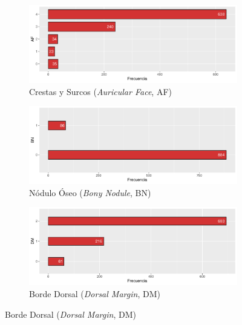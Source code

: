 \begin{figure}[h]
    \centering
    \begin{subfigure}{\textwidth}
        \includegraphics[width=\linewidth]{../../scripts/eda/eda_univar/char_af_distr.pdf}
        \caption{Crestas y Surcos (\textit{Auricular Face}, AF)}
        \label{fig4:todd_chars__af}
    \end{subfigure}

    \begin{subfigure}{\textwidth}
        \includegraphics[width=\linewidth]{../../scripts/eda/eda_univar/char_bn_distr.pdf}
        \caption{Nódulo Óseo (\textit{Bony Nodule}, BN)}
        \label{fig4:todd_chars__bn}
    \end{subfigure}
    
    \begin{subfigure}{\textwidth}
        \includegraphics[width=\linewidth]{../../scripts/eda/eda_univar/char_dm_distr.pdf}
        \caption{Borde Dorsal (\textit{Dorsal Margin}, DM)}
        \label{fig4:todd_chars__dm}
    \end{subfigure}

\end{figure}
